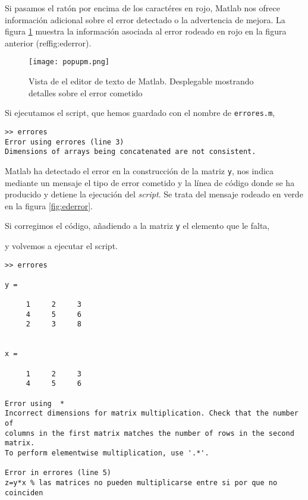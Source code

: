 \begin{enumerate}
Si pasamos el ratón por encima de los caractéres en rojo, Matlab nos ofrece información adicional sobre el error detectado o la advertencia de mejora. La figura \ref{fig:popupm} muestra la información asociada al error rodeado en rojo en la figura anterior (ref{fig:ederror}).

\begin{figure}[h]
\centering
\texttt{[image: popupm.png]}
\caption{Vista de el editor de texto de Matlab. Desplegable mostrando detalles sobre el error cometido}
\label{fig:popupm}
\end{figure}

Si ejecutamos el script, que hemos guardado con el nombre de \texttt{errores.m},

\begin{verbatim}
>> errores
Error using errores (line 3)
Dimensions of arrays being concatenated are not consistent.
\end{verbatim}

Matlab ha detectado el error en la construcción de la matriz \texttt{y}, nos indica mediante un mensaje el tipo de error cometido y la línea de código donde se ha producido y detiene la ejecución del \emph{script}. Se trata del mensaje rodeado en verde en la figura \ref{fig:ederror}.

Si corregimos el código, añadiendo a la matriz \texttt{y} el elemento que le falta,

y volvemos a ejecutar el script.
\begin{verbatim}
>> errores

y =

     1     2     3
     4     5     6
     2     3     8


x =

     1     2     3
     4     5     6

Error using  * 
Incorrect dimensions for matrix multiplication. Check that the number of
columns in the first matrix matches the number of rows in the second matrix.
To perform elementwise multiplication, use '.*'.

Error in errores (line 5)
z=y*x % las matrices no pueden multiplicarse entre si por que no coinciden


\end{verbatim}
\end{enumerate}
